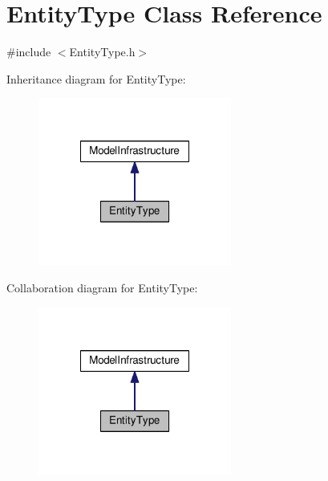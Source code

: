 \hypertarget{class_entity_type}{\section{Entity\-Type Class Reference}
\label{class_entity_type}
}


{\ttfamily \#include $<$Entity\-Type.\-h$>$}



Inheritance diagram for Entity\-Type\-:\nopagebreak
\begin{figure}[H]
\begin{center}
\leavevmode
\includegraphics[width=180pt]{class_entity_type__inherit__graph}
\end{center}
\end{figure}


Collaboration diagram for Entity\-Type\-:\nopagebreak
\begin{figure}[H]
\begin{center}
\leavevmode
\includegraphics[width=180pt]{class_entity_type__coll__graph}
\end{center}
\end{figure}
